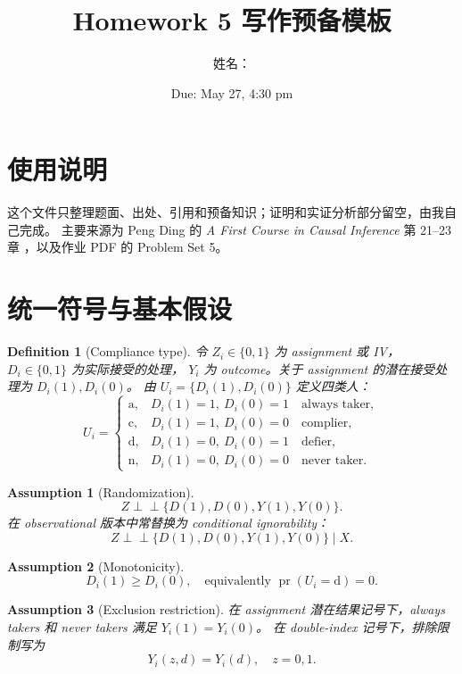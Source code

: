 \documentclass[11pt]{ctexart}
\title{Homework 5 写作预备模板}
\author{姓名：\underline{\hspace{3cm}}}
\date{Due: May 27, 4:30 pm}
\newtheorem{assumption}{Assumption}
\newtheorem{definition}{Definition}
\newcommand{\pr}{\operatorname{pr}}
\newcommand{\ind}{\perp\!\!\!\perp}
\newcommand{\at}{\mathrm{a}}
\newcommand{\nt}{\mathrm{n}}
\newcommand{\cp}{\mathrm{c}}
\newcommand{\df}{\mathrm{d}}
\begin{document}
\maketitle
\tableofcontents

\section*{使用说明}
这个文件只整理题面、出处、引用和预备知识；证明和实证分析部分留空，由我自己完成。
主要来源为 Peng Ding 的 \emph{A First Course in Causal Inference} 第 21--23 章
\citep{imbens1994identification,angrist1996identification}，以及作业 PDF 的 Problem Set 5。

\section{统一符号与基本假设}

\begin{definition}[Compliance type]
令 \(Z_i\in\{0,1\}\) 为 assignment 或 IV，\(D_i\in\{0,1\}\) 为实际接受的处理，
\(Y_i\) 为 outcome。关于 assignment 的潜在接受处理为 \(D_i(1),D_i(0)\)。
由 \(U_i=\{D_i(1),D_i(0)\}\) 定义四类人：
\[
U_i=
\begin{cases}
\at, & D_i(1)=1,\ D_i(0)=1 \quad \text{always taker},\\
\cp, & D_i(1)=1,\ D_i(0)=0 \quad \text{complier},\\
\df, & D_i(1)=0,\ D_i(0)=1 \quad \text{defier},\\
\nt, & D_i(1)=0,\ D_i(0)=0 \quad \text{never taker}.
\end{cases}
\]
\end{definition}

\begin{assumption}[Randomization]
\[
Z\ind \{D(1),D(0),Y(1),Y(0)\}.
\]
在 observational 版本中常替换为 conditional ignorability：
\[
Z\ind \{D(1),D(0),Y(1),Y(0)\}\mid X.
\]
\end{assumption}

\begin{assumption}[Monotonicity]
\[
D_i(1)\ge D_i(0), \quad \text{equivalently } \pr(U_i=\df)=0.
\]
\end{assumption}

\begin{assumption}[Exclusion restriction]
在 assignment 潜在结果记号下，always takers 和 never takers 满足 \(Y_i(1)=Y_i(0)\)。
在 double-index 记号下，排除限制写为
\[
Y_i(z,d)=Y_i(d),\quad z=0,1.
\]
\end{assumption}
\end{document}
